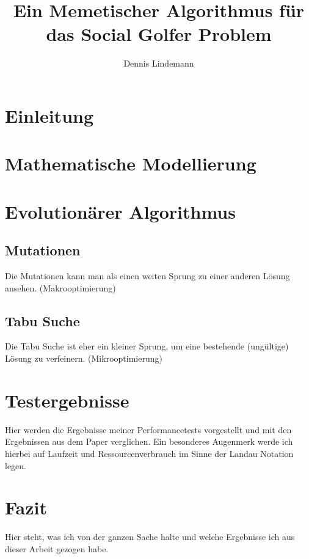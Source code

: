 \documentclass[draft]{tcs-seminar}
\begin{document}
\title{Ein Memetischer Algorithmus für das Social Golfer Problem}
\author{Dennis Lindemann}

\begin{abstract}

\end{abstract}

\maketitle


\section{Einleitung}
  


\section{Mathematische Modellierung}
    
\section{Evolutionärer Algorithmus}
  \subsection{Mutationen}
    Die Mutationen kann man als einen weiten Sprung zu einer anderen Lösung ansehen. (Makrooptimierung)
  \subsection{Tabu Suche}
    Die Tabu Suche ist eher ein kleiner Sprung, um eine bestehende (ungültige) Lösung zu verfeinern. (Mikrooptimierung)

\section{Testergebnisse}
Hier werden die Ergebnisse meiner Performancetests vorgestellt und mit den Ergebnissen aus dem Paper verglichen. Ein besonderes Augenmerk werde ich hierbei auf Laufzeit und Ressourcenverbrauch im Sinne der Landau Notation legen.



\section{Fazit}
Hier steht, was ich von der ganzen Sache halte und welche Ergebnisse ich aus dieser Arbeit gezogen habe.

\begin{thebibliography}{9}  
    
\end{thebibliography}
\end{document}
